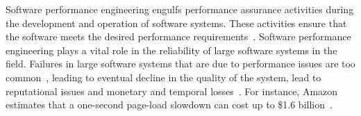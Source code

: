 




Software performance engineering engulfs performance assurance activities during the development and operation of software systems. These activities ensure that the software meets the desired performance requirements~\cite{futureofspe}. Software performance engineering plays a vital role in the reliability of large software systems in the field. Failures in large software systems that are due to performance issues are too common~\cite{tailatscale, foo2010mining}, leading to eventual decline in the quality of the system, lead to reputational issues and monetary and temporal losses~\cite{costofdowntime}. For instance, Amazon estimates that a one-second page-load slowdown can cost up to \$1.6 billion~\cite{amazononesec}. 

